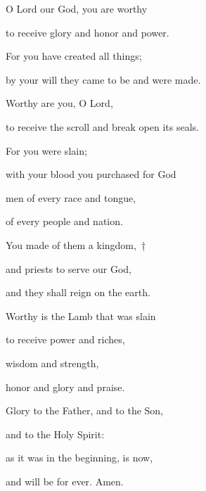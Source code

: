 \noindent O Lord our God, you are worthy ~\GreStar{}~\nopagebreak

to receive glory and honor and power.

\noindent For you have created all things; ~\GreStar{}~\nopagebreak

by your will they came to be and were made.

\noindent Worthy are you, O Lord, ~\GreStar{}~\nopagebreak

to receive the scroll and break open its seals.

\noindent For you were slain; ~\GreStar{}~\nopagebreak

with your blood you purchased for God

\noindent men of every race and tongue, ~\GreStar{}~\nopagebreak

of every people and nation.

\noindent You made of them a kingdom,~†~\nopagebreak

and priests to serve our God, ~\GreStar{}~\nopagebreak

and they shall reign on the earth.

\noindent Worthy is the Lamb that was slain ~\GreStar{}~\nopagebreak

to receive power and riches,

\noindent wisdom and strength, ~\GreStar{}~\nopagebreak

honor and glory and praise.

\noindent Glory to the Father, and to the Son,~\GreStar{}~\nopagebreak

and to the Holy Spirit:

\noindent as it was in the beginning, is now,~\GreStar{}~\nopagebreak

and will be for ever. Amen.

